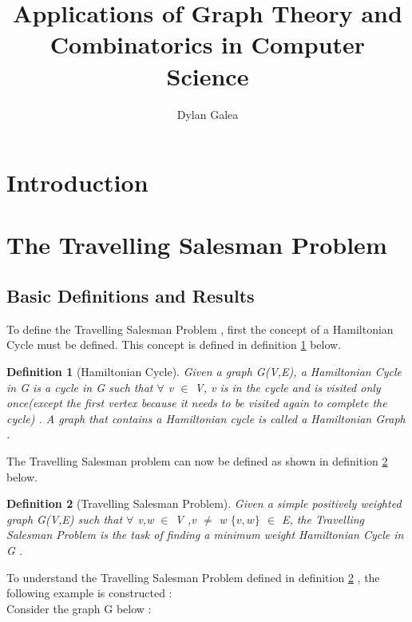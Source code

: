\documentclass{article}
\title{Applications of Graph Theory and Combinatorics in Computer Science}
\author{Dylan Galea}
\newtheorem{definition}{Definition}[subsection]
\begin{document}
\maketitle
\newpage
\tableofcontents
\newpage
\section{Introduction}
\newpage
\section{The Travelling Salesman Problem}
\subsection{Basic Definitions and Results}
To define the Travelling Salesman Problem , first the concept of a Hamiltonian Cycle must be defined. This concept is defined in definition \ref{Hamiltonian Cycle} below.
\begin{definition}[Hamiltonian Cycle]
\label{Hamiltonian Cycle}
Given a graph G(V,E), a Hamiltonian Cycle in G is a cycle in G such that $\forall$ v $\in$ V, v is in the cycle and is visited only once(except the first vertex because it needs to be visited again to complete the cycle) . A graph that contains a Hamiltonian cycle is called a Hamiltonian Graph \cite{weisstein_2018}.
\end{definition}
The Travelling Salesman problem can now be defined as shown in definition \ref{Travelling Salesman Problem} below.
\begin{definition}[Travelling Salesman Problem]
\label{Travelling Salesman Problem}
Given a simple positively weighted graph G(V,E) such that $\forall$ v,w $\in$ V ,v $\ne$ w $\{v,w\}$ $\in$ E, the Travelling Salesman Problem is the task of finding a minimum weight Hamiltonian Cycle in G \cite{geeksforgeeks_2018}.
\end{definition}
To understand the Travelling Salesman Problem defined in definition \ref{Travelling Salesman Problem} , the following example is constructed :\\
Consider the graph G below :


\end{document}
